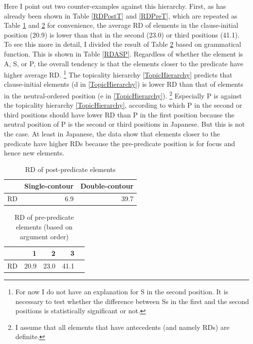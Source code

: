 Here I point out two counter-examples against this hierarchy.
First,
as has already been shown in Table \ref{RDPostT} and \ref{RDPreT},
which are repeated as Table \ref{RDPostT2} and \ref{RDPreT2} for convenience,
the average RD of elements in the clause-initial position (20.9) is lower than that in the second (23.0) or third positions (41.1).
To see this more in detail,
I divided the result of Table \ref{RDPreT2} based on grammatical function.
This is shown in Table \ref{RDASP}.
Regardless of whether the element is A, S, or P,
the overall tendency is that
the elements closer to the predicate have higher average RD.%
 \footnote{
 For now I do not have an explanation for S in the second position.
 It is necessary to test whether the difference between Ss in the first and the second positions is statistically significant or not.
 }
The topicality hierarchy \ref{TopicHierarchy} predicts that
clause-initial elements (d in \ref{TopicHierarchy}) is lower RD than that of elements in the neutral-ordered position (e in \ref{TopicHierarchy}).%
	\footnote{
	I assume that all elements that have antecedents (and namely RDs) are definite.
	}
Especially P is against the topicality hierarchy \ref{TopicHierarchy},
according to which P in the second or third positions should have lower RD than P in the first position because the neutral position of P is the second or third positions in Japanese.
But this is not the case.
At least in Japanese,
the data show that
elements closer to the predicate have higher RDs
because the pre-predicate position is for focus and hence new elements.

\begin{table}[bht]
\centering
\caption{RD of post-predicate elements}
\begin{tabular}{lrr}
\toprule
  & Single-contour & Double-contour \\
\midrule
RD & 6.9 & 39.7 \\
\bottomrule
\end{tabular}
\label{RDPostT2}
\end{table}
\begin{table}
\centering
\caption{RD of pre-predicate elements (based on argument order)}
\begin{tabular}{lrrrr}
\toprule
  &  1  & 2 & 3 \\
\midrule
RD & 20.9 & 23.0 & 41.1 \\
\bottomrule
\end{tabular}
\label{RDPreT2}
\end{table}

